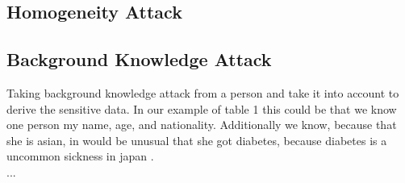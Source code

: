 \documentclass{llncs}
\begin{document}
\subsection{Homogeneity Attack}

\subsection{Background Knowledge Attack}

Taking background knowledge attack from a person and take it into account to derive the sensitive data. In our example of table 1 this could be that we know one person my name, age, and nationality. Additionally we know, because that she is asian, in would be unusual that she got diabetes, because diabetes is a uncommon sickness in japan \cite{ldiversity}.
\\...
\end{document}
